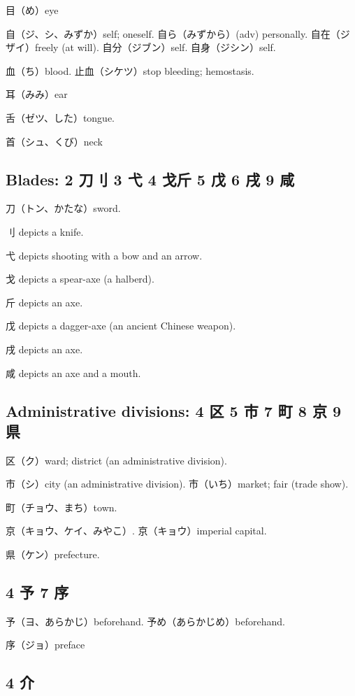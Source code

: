 目（め）eye

自（ジ、シ、みずか）self; oneself.
自ら（みずから）(adv) personally.
自在（ジザイ）freely (at will).
自分（ジブン）self.
自身（ジシン）self.

血（ち）blood.
止血（シケツ）stop bleeding; hemostasis.

耳（みみ）ear

舌（ゼツ、した）tongue.

首（シュ、くび）neck

\subsection{Blades: 2 刀刂 3 弋 4 戈斤 5 戊 6 戌 9 咸}

刀（トン、かたな）sword.

刂 depicts a knife.

弋 depicts shooting with a bow and an arrow.

戈 depicts a spear-axe (a halberd).

斤 depicts an axe.

戊 depicts a dagger-axe (an ancient Chinese weapon).

戌 depicts an axe.

咸 depicts an axe and a mouth.

\subsection{Administrative divisions: 4 区 5 市 7 町 8 京 9 県}


区（ク）ward; district (an administrative division).

市（シ）city (an administrative division).
市（いち）market; fair (trade show).

町（チョウ、まち）town.

京（キョウ、ケイ、みやこ）.
京（キョウ）imperial capital.

県（ケン）prefecture.

\subsection{4 予 7 序}

予（ヨ、あらかじ）beforehand.
予め（あらかじめ）beforehand.

序（ジョ）preface

\subsection{4 介}

